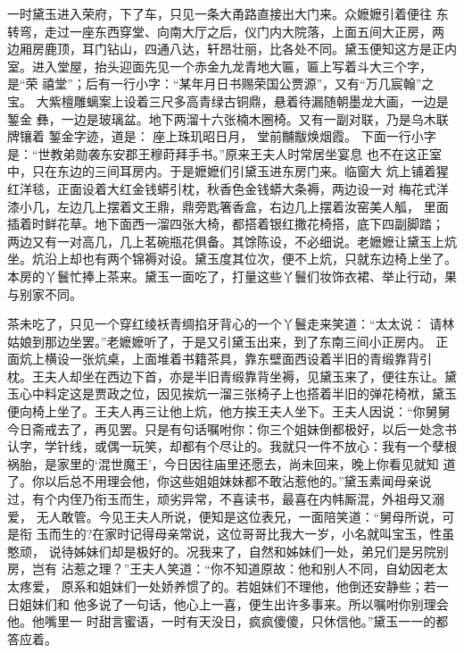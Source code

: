 一时黛玉进入荣府，下了车，只见一条大甬路直接出大门来。众嬷嬷引着便往
东转弯，走过一座东西穿堂、向南大厅之后，仪门内大院落，上面五间大正房，两
边厢房鹿顶，耳门钻山，四通八达，轩昂壮丽，比各处不同。黛玉便知这方是正内
室。进入堂屋，抬头迎面先见一个赤金九龙青地大匾，匾上写着斗大三个字，是“荣
禧堂”；后有一行小字：“某年月日书赐荣国公贾源”，又有“万几宸翰”之宝。
大紫檀雕螭案上设着三尺多高青绿古铜鼎，悬着待漏随朝墨龙大画，一边是錾金
彝，一边是玻璃盆。地下两溜十六张楠木圈椅。又有一副对联，乃是乌木联牌镶着
錾金字迹，道是：
座上珠玑昭日月，
堂前黼黻焕烟霞。
下面一行小字是：“世教弟勋袭东安郡王穆莳拜手书。”原来王夫人时常居坐宴息
也不在这正室中，只在东边的三间耳房内。于是嬷嬷们引黛玉进东房门来。临窗大
炕上铺着猩红洋毯，正面设着大红金钱蟒引枕，秋香色金钱蟒大条褥，两边设一对
梅花式洋漆小几，左边几上摆着文王鼎，鼎旁匙箸香盒，右边几上摆着汝窑美人觚，
里面插着时鲜花草。地下面西一溜四张大椅，都搭着银红撒花椅搭，底下四副脚踏；
两边又有一对高几，几上茗碗瓶花俱备。其馀陈设，不必细说。老嬷嬷让黛玉上炕
坐。炕沿上却也有两个锦褥对设。黛玉度其位次，便不上炕，只就东边椅上坐了。
本房的丫鬟忙捧上茶来。黛玉一面吃了，打量这些丫鬟们妆饰衣裙、举止行动，果
与别家不同。

茶未吃了，只见一个穿红绫袄青绸掐牙背心的一个丫鬟走来笑道：“太太说：
请林姑娘到那边坐罢。”老嬷嬷听了，于是又引黛玉出来，到了东南三间小正房内。
正面炕上横设一张炕桌，上面堆着书籍茶具，靠东壁面西设着半旧的青缎靠背引
枕。王夫人却坐在西边下首，亦是半旧青缎靠背坐褥，见黛玉来了，便往东让。黛
玉心中料定这是贾政之位，因见挨炕一溜三张椅子上也搭着半旧的弹花椅袱，黛玉
便向椅上坐了。王夫人再三让他上炕，他方挨王夫人坐下。王夫人因说：“你舅舅
今日斋戒去了，再见罢。只是有句话嘱咐你：你三个姐妹倒都极好，以后一处念书
认字，学针线，或偶一玩笑，却都有个尽让的。我就只一件不放心：我有一个孽根
祸胎，是家里的‘混世魔王’，今日因往庙里还愿去，尚未回来，晚上你看见就知
道了。你以后总不用理会他，你这些姐姐妹妹都不敢沾惹他的。”黛玉素闻母亲说
过，有个内侄乃衔玉而生，顽劣异常，不喜读书，最喜在内帏厮混，外祖母又溺爱，
无人敢管。今见王夫人所说，便知是这位表兄，一面陪笑道：“舅母所说，可是衔
玉而生的?在家时记得母亲常说，这位哥哥比我大一岁，小名就叫宝玉，性虽憨顽，
说待姊妹们却是极好的。况我来了，自然和姊妹们一处，弟兄们是另院别房，岂有
沾惹之理？”王夫人笑道：“你不知道原故：他和别人不同，自幼因老太太疼爱，
原系和姐妹们一处娇养惯了的。若姐妹们不理他，他倒还安静些；若一日姐妹们和
他多说了一句话，他心上一喜，便生出许多事来。所以嘱咐你别理会他。他嘴里一
时甜言蜜语，一时有天没日，疯疯傻傻，只休信他。”黛玉一一的都答应着。

